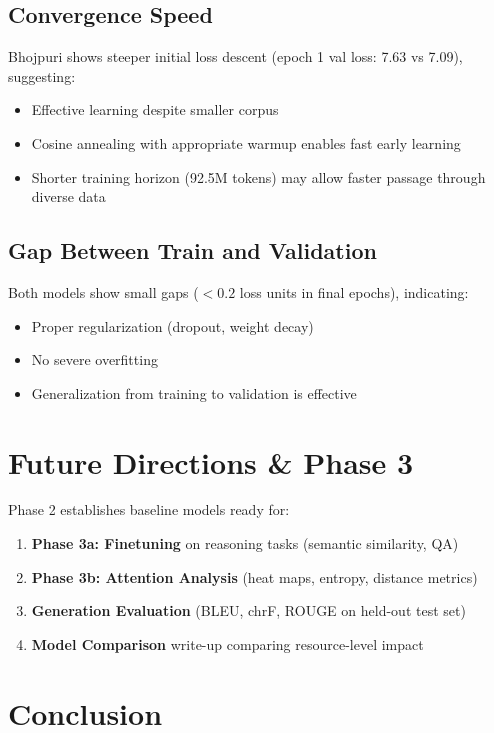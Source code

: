 \documentclass[11pt,a4paper]{article}
\begin{document}
\subsection{Convergence Speed}

Bhojpuri shows steeper initial loss descent (epoch 1 val loss: 7.63 vs 7.09), suggesting:
\begin{itemize}
    \item Effective learning despite smaller corpus
    \item Cosine annealing with appropriate warmup enables fast early learning
    \item Shorter training horizon (92.5M tokens) may allow faster passage through diverse data
\end{itemize}

\subsection{Gap Between Train and Validation}

Both models show small gaps ($< 0.2$ loss units in final epochs), indicating:
\begin{itemize}
    \item Proper regularization (dropout, weight decay)
    \item No severe overfitting
    \item Generalization from training to validation is effective
\end{itemize}

\section{Future Directions \& Phase 3}

Phase 2 establishes baseline models ready for:

\begin{enumerate}
    \item \textbf{Phase 3a: Finetuning} on reasoning tasks (semantic similarity, QA)
    \item \textbf{Phase 3b: Attention Analysis} (heat maps, entropy, distance metrics)
    \item \textbf{Generation Evaluation} (BLEU, chrF, ROUGE on held-out test set)
    \item \textbf{Model Comparison} write-up comparing resource-level impact
\end{enumerate}

\section{Conclusion}
\end{document}
